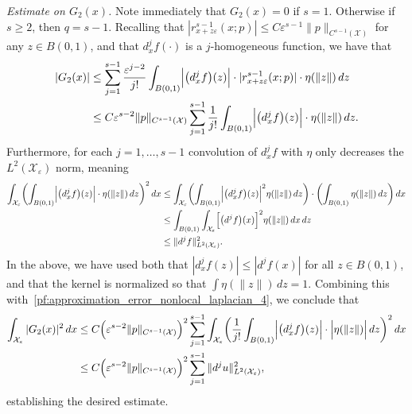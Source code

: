 \documentclass[aos]{imsart}
\theoremstyle{plain}
\theoremstyle{definition}
\theoremstyle{remark}
\newcommand{\mc}[1]{\mathcal{#1}}
\newcommand{\1}{\mathbf{1}}
\begin{document}
\emph{Estimate on $G_2(x)$.}
Note immediately that $G_2(x) = 0$ if $s = 1$. Otherwise if $s \geq 2$, then $q = s - 1$. Recalling that $|r_{x + z\varepsilon}^{s - 1}(x; p)| \leq C\varepsilon^{s - 1}\|p\|_{C^{s - 1}(\mc{X})}$ for any $z \in B(0,1)$, and that $d_x^jf(\cdot)$ is a $j$-homogeneous function, we have that
\begin{align}
|G_2(x)| & \leq \sum_{j = 1}^{s - 1} \frac{\varepsilon^{j - 2}}{j!}\int_{B(0,1)} \Bigl|\bigl(d_x^{j}f\bigr)(z)\Bigr| \cdot |r_{x + z\varepsilon}^{s - 1}(x;p)| \cdot \eta(\|z\|) \,dz \nonumber \\
& \leq C\varepsilon^{s - 2}\|p\|_{C^{s - 1}(\mc{X})} \sum_{j = 1}^{s - 1} \frac{1}{j!} \int_{B(0,1)} \Bigl|\bigl(d_x^{j}f\bigr)(z)\Bigr| \cdot \eta(\|z\|) \,dz \label{pf:approximation_error_nonlocal_laplacian_4}.
\end{align}
Furthermore, for each $j = 1,\ldots,s - 1$ convolution of $d_x^jf$ with $\eta$ only decreases the $L^2(\mc{X}_{\varepsilon})$ norm, meaning
\begin{equation}
\label{pf:approximation_error_nonlocal_laplacian_5}
\begin{aligned}
\int_{\mc{X}_{\varepsilon}} \biggl(\int_{B(0,1)} \Bigl|\bigl(d_x^{j}f\bigr)(z)\Bigr| \cdot \eta(\|z\|) \,dz\biggr)^2 \,dx & \leq \int_{\mc{X}_{\varepsilon}} \biggl(\int_{B(0,1)} \Bigl|\bigl(d_x^jf\bigr)(z)\Bigr|^2 \eta(\|z\|)\,dz \biggr) \cdot \biggl(\int_{B(0,1)} \eta(\|z\|) \,dz \biggr) \,dx \\
& \leq \int_{B(0,1)} \int_{\mc{X}_{\varepsilon}} \Bigl[\bigl(d^jf\bigr)(x)\Bigr]^2 \eta(\|z\|) \,dx  \,dz \\
& \leq \|d^jf\|_{L^2(\mc{X_{\varepsilon}})}^2.
\end{aligned}
\end{equation}
In the above, we have used both that $|d_x^jf(z)| \leq |d^jf(x)|$ for all $z \in B(0,1)$, and that the kernel is normalized so that $\int \eta(\|z\|) \,dz = 1$. 
Combining this with~\eqref{pf:approximation_error_nonlocal_laplacian_4}, we conclude that
\begin{align*}
\int_{\mc{X}_{\varepsilon}} |G_2(x)|^2 \,dx & \leq C \Bigl(\varepsilon^{s - 2}\|p\|_{C^{s - 1}(\mc{X})}\Bigr)^2 \sum_{j = 1}^{s - 1} \int_{\mc{X}_{\varepsilon}}\biggl(\frac{1}{j!} \int_{B(0,1)} \Bigl|\bigl(d_x^{j}f\bigr)(z)\Bigr| \cdot \Bigl|\eta(\|z\|)\Bigr| \,dz\biggr)^2 \,dx \\
& \leq C \Bigl(\varepsilon^{s - 2}\|p\|_{C^{s - 1}(\mc{X})}\Bigr)^2 \sum_{j = 1}^{s - 1} \|d^ju\|_{L^2(\mc{X_{\varepsilon}})}^2,
\end{align*}
establishing the desired estimate.
\end{document}
